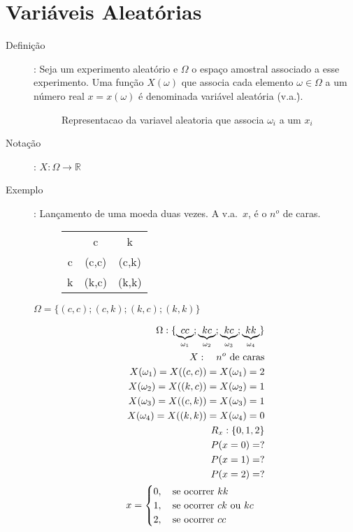    \section{Variáveis Aleatórias}
   \begin{description}
     \item [Definição]: Seja um experimento aleatório e $\Omega$ o espaço amostral associado 
       a esse experimento. Uma função $X(\omega)$ que associa cada elemento $\omega \in
       \Omega$ a um número real $x=x(\omega)$ é denominada variável aleatória (v.a.\.). 
       \begin{figure}[H]
         \centering
         
         \caption{Representacao da variavel aleatoria que associa $\omega_i$ a um $x_i$}
         \label{fig:23}
       \end{figure}
     \item [Notação]: $X:\Omega \to \mathbb{R}$

     \item [Exemplo]: Lançamento de uma moeda duas vezes. A v.a.\, $x$, é o $n^o$ de caras. 
       \begin{figure} [H]
         \centering
         \begin{tabular}{c c c}
           \toprule
           &c&k\\ \cmidrule{2-3}
           c&(c,c)&(c,k)\\ \cmidrule{2-3}
           k&(k,c)&(k,k)\\    \bottomrule
         \end{tabular}
         \label{tab:3}
       \end{figure}
       $\Omega = \{ (c,c); (c,k) ; (k,c) ; (k,k)\}$

       \begin{align*}
         \Omega : \{ \underbrace{cc}_{\omega_1};\underbrace{kc}_{\omega_2};\underbrace{kc}_{\omega_3};\underbrace{kk}_{\omega_4} \}\\
         X: \text{\quad $n^o$ de caras}\\
         X(\omega_1)= X((c,c))= X(\omega_1)=2\\
         X(\omega_2)= X((k,c))= X(\omega_2)=1\\
         X(\omega_3)= X((c,k))= X(\omega_3)=1\\
         X(\omega_4)= X((k,k))= X(\omega_4)=0\\
         R_x: \{0,1,2 \}\\
         P(x=0)=?\\
         P(x=1)=? \\
         P(x=2)=? \\
         x=
         \begin{cases}
           0, \text{\quad se ocorrer $kk$} \\
           1, \text{\quad se ocorrer $ck$ ou $kc$} \\
           2,\text{\quad se ocorrer $cc$}
         \end{cases}
       \end{align*}


\end{description}
